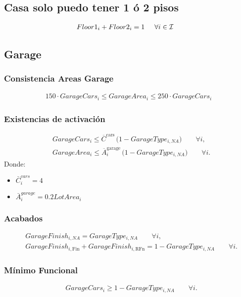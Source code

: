 \documentclass{article}
\begin{document}
\subsection{Casa solo puedo tener 1 ó 2 pisos}
\begin{align}
    &Floor1_{i} +Floor2_{i}=1 \hspace{5mm} \forall i \in \mathcal{I}
\end{align}
\subsection{Garage}
\subsubsection{Consistencia Areas Garage}
\begin{align}
    150\cdot GarageCars_{i} \leq GarageArea_{i}\leq 250 \cdot GarageCars_{i}
\end{align}
\subsubsection{Existencias de activación}
\begin{align}
& GarageCars_i \le \overline{C}^{\text{cars}} \,\big(1 - GarageType_{i,NA}\big) \qquad \forall i,\\
& GarageArea_i \le \overline{A}^{\text{garage}}_i \,\big(1 - GarageType_{i,NA}\big) \qquad \forall i.
\end{align}
Donde:
\begin{itemize}
    \item $\bar{C}_{i}^{cars}=4$
    \item $\bar{A}_{i}^{garage}=0.2 LotArea_{i}$
\end{itemize}
\subsubsection{Acabados}
\begin{align}
& GarageFinish_{i,NA} = GarageType_{i,NA} \qquad \forall i,\\
& GarageFinish_{i,\text{Fin}} + GarageFinish_{i,\text{RFn}} 
  = 1 - GarageType_{i,NA} \qquad \forall i.
\end{align}


\subsubsection{Mínimo Funcional}
\begin{align}
& GarageCars_i \ge 1 - GarageType_{i,NA} \qquad \forall i.
\end{align}
\end{document}
